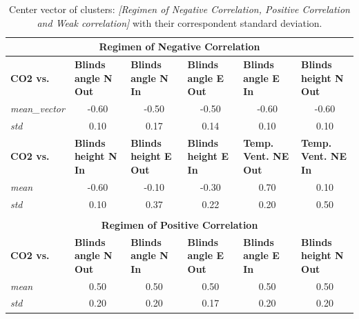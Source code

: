\begin{table}[htbp]
  \centering
  \tiny
  \caption{Center vector of clusters: \textit{[Regimen of Negative Correlation, Positive Correlation and Weak correlation]} with their correspondent standard deviation.}
    \begin{tabular}{|l|c|c|c|c|c|}
    \multicolumn{6}{c}{\textcolor[rgb]{ .31,  .506,  .741}{\textbf{Regimen of Negative Correlation}}} \bigstrut[b]\\
    \hline
    \textbf{CO2 vs.} & \multicolumn{1}{l|}{\textbf{Blinds angle N Out}} & \multicolumn{1}{l|}{\textbf{ Blinds angle N In}} & \multicolumn{1}{l|}{\textbf{ Blinds angle E Out}} & \multicolumn{1}{l|}{\textbf{Blinds angle E In}} & \multicolumn{1}{l|}{\textbf{Blinds height N Out}} \bigstrut\\
    \hline
    \textit{mean\_vector} & -0.60 & -0.50 & -0.50 & -0.60 & -0.60 \bigstrut\\
    \hline
    \textit{std} & 0.10 & 0.17 & 0.14 & 0.10 & 0.10 \bigstrut\\
    \hline
    \textbf{CO2 vs.} & \multicolumn{1}{l|}{\textbf{Blinds height N In}} & \multicolumn{1}{l|}{\textbf{ Blinds height E Out}} & \multicolumn{1}{l|}{\textbf{Blinds height E In}} & \multicolumn{1}{l|}{\textbf{Temp. Vent. NE Out}} & \multicolumn{1}{l|}{\textbf{Temp. Vent. NE In}} \bigstrut\\
    \hline
    \textit{mean} & -0.60 & -0.10 & -0.30 & 0.70 & 0.10 \bigstrut\\
    \hline
    \textit{std} & 0.10 & 0.37 & 0.22 & 0.20 & 0.50 \bigstrut\\
    \hline
    \multicolumn{1}{l}{} & \multicolumn{1}{c}{} & \multicolumn{1}{c}{} & \multicolumn{1}{c}{} & \multicolumn{1}{c}{} & \multicolumn{1}{c}{} \bigstrut[t]\\
    \multicolumn{6}{c}{\textcolor[rgb]{ .31,  .506,  .741}{\textbf{Regimen of Positive Correlation}}} \bigstrut[b]\\
    \hline
    \textbf{CO2 vs.} & \multicolumn{1}{l|}{\textbf{Blinds angle N Out}} & \multicolumn{1}{l|}{\textbf{ Blinds angle N In}} & \multicolumn{1}{l|}{\textbf{ Blinds angle E Out}} & \multicolumn{1}{l|}{\textbf{Blinds angle E In}} & \multicolumn{1}{l|}{\textbf{Blinds height N Out}} \bigstrut\\
    \hline
    \textit{mean} & 0.50 & 0.50 & 0.50 & 0.50 & 0.50 \bigstrut\\
    \hline
    \textit{std} & 0.20 & 0.20 & 0.17 & 0.20 & 0.20 \bigstrut\\

\end{tabular}
\end{table}
